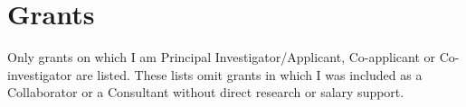 \documentclass[11pt]{moderncv}
\begin{document}
\nocite{*}
 




\vspace{1em}

\vspace{1em}



\section{Grants}

Only grants on which I am Principal Investigator/Applicant, Co-applicant or Co-investigator are listed.
These lists omit grants in which I was included as a Collaborator or a Consultant without direct research or salary support.



%
\end{document}
